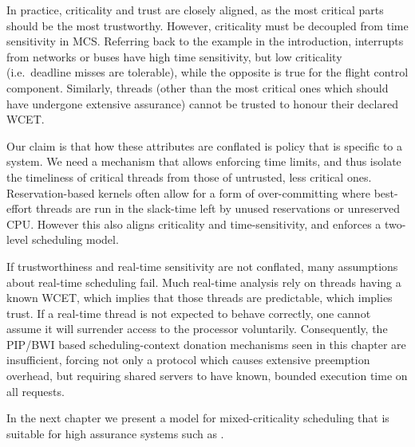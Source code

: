 In practice, criticality and trust are closely aligned, as the most
critical parts should be the most trustworthy.
However, criticality must be decoupled from time sensitivity in MCS.
Referring back to the
example in the introduction, interrupts from networks or buses have
high time sensitivity, but low criticality (i.e.\ deadline misses are
tolerable), while the opposite is true for the flight control component.
Similarly, threads (other than the most critical ones which should
have undergone extensive assurance) cannot be
trusted to honour their declared WCET.

Our claim is that how these attributes are conflated is
policy that is specific to a system.
We need a mechanism that allows  enforcing time limits, and thus
isolate the timeliness of critical threads from those of untrusted,
less critical ones.
Reservation-based kernels often allow for a form of over-committing where
best-effort threads are run in the slack-time left by unused reservations or unreserved CPU.
However this also aligns criticality and time-sensitivity, and
enforces a two-level scheduling model.

If trustworthiness and real-time sensitivity are not conflated, many assumptions about real-time
scheduling fail.
Much real-time analysis rely on threads having a known \gls{WCET}, which implies that those threads
are predictable, which implies trust.
If a real-time thread is not expected to behave correctly, one cannot
assume it will surrender access to the processor voluntarily.
Consequently, the \gls{PIP}/\gls{BWI} based scheduling-context donation mechanisms seen in this chapter are
insufficient, forcing not only a protocol which causes extensive preemption overhead, but 
requiring shared servers to have known, bounded execution time on all requests.

In the next chapter we present a model for mixed-criticality scheduling that is suitable for high
assurance systems such as \selfour. 
